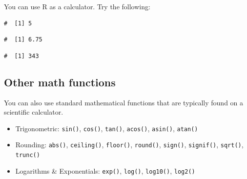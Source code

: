 \documentclass[a4paper,9pt,twocolumn,twoside,printwatermark=false]{pinp}
\providecommand{\tightlist}{%
  \setlength{\itemsep}{0pt}\setlength{\parskip}{0pt}}
\begin{document}
You can use R as a calculator. Try the following:

\begin{Shaded}
\begin{Highlighting}[]
 \OperatorTok{+}\StringTok{ }           
\end{Highlighting}
\end{Shaded}

\begin{ShadedResult}
\begin{verbatim}
#  [1] 5
\end{verbatim}
\end{ShadedResult}

\begin{Shaded}
\begin{Highlighting}[]
\NormalTok{(}\OperatorTok{*}\NormalTok{)}\OperatorTok{/} \OperatorTok{-}\StringTok{ }     
\end{Highlighting}
\end{Shaded}

\begin{ShadedResult}
\begin{verbatim}
#  [1] 6.75
\end{verbatim}
\end{ShadedResult}

\begin{Shaded}
\begin{Highlighting}[]
\OperatorTok{^} 
\end{Highlighting}
\end{Shaded}

\begin{ShadedResult}
\begin{verbatim}
#  [1] 343
\end{verbatim}
\end{ShadedResult}

\subsection{Other math functions}\label{other-math-functions}

You can also use standard mathematical functions that are typically
found on a scientific calculator.

\begin{itemize}
\tightlist
\item
  Trigonometric: \texttt{sin()}, \texttt{cos()}, \texttt{tan()},
  \texttt{acos()}, \texttt{asin()}, \texttt{atan()}
\item
  Rounding: \texttt{abs()}, \texttt{ceiling()}, \texttt{floor()},
  \texttt{round()}, \texttt{sign()}, \texttt{signif()}, \texttt{sqrt()},
  \texttt{trunc()}
\item
  Logarithms \& Exponentials: \texttt{exp()}, \texttt{log()},
  \texttt{log10()}, \texttt{log2()}
\end{itemize}
\end{document}
